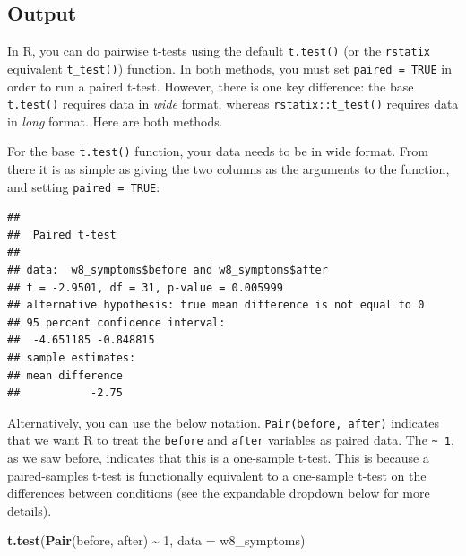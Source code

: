 \documentclass[
]{book}
\newenvironment{Shaded}{\begin{snugshade}}{\end{snugshade}}
\newcommand{\AttributeTok}[1]{\textcolor[rgb]{0.13,0.29,0.53}{#1}}
\newcommand{\ConstantTok}[1]{\textcolor[rgb]{0.56,0.35,0.01}{#1}}
\newcommand{\DecValTok}[1]{\textcolor[rgb]{0.00,0.00,0.81}{#1}}
\newcommand{\FunctionTok}[1]{\textcolor[rgb]{0.13,0.29,0.53}{\textbf{#1}}}
\newcommand{\NormalTok}[1]{#1}
\newcommand{\SpecialCharTok}[1]{\textcolor[rgb]{0.81,0.36,0.00}{\textbf{#1}}}
\begin{document}
\hypertarget{output-4}{%
\subsection{Output}\label{output-4}}

In R, you can do pairwise t-tests using the default \texttt{t.test()} (or the \texttt{rstatix} equivalent \texttt{t\_test()}) function. In both methods, you must set \texttt{paired\ =\ TRUE} in order to run a paired t-test. However, there is one key difference: the base \texttt{t.test()} requires data in \emph{wide} format, whereas \texttt{rstatix::t\_test()} requires data in \emph{long} format. Here are both methods.

For the base \texttt{t.test()} function, your data needs to be in wide format. From there it is as simple as giving the two columns as the arguments to the function, and setting \texttt{paired\ =\ TRUE}:

\begin{Shaded}
\end{Shaded}

\begin{verbatim}
## 
##  Paired t-test
## 
## data:  w8_symptoms$before and w8_symptoms$after
## t = -2.9501, df = 31, p-value = 0.005999
## alternative hypothesis: true mean difference is not equal to 0
## 95 percent confidence interval:
##  -4.651185 -0.848815
## sample estimates:
## mean difference 
##           -2.75
\end{verbatim}

Alternatively, you can use the below notation. \texttt{Pair(before,\ after)} indicates that we want R to treat the \texttt{before} and \texttt{after} variables as paired data. The \texttt{\textasciitilde{}\ 1}, as we saw before, indicates that this is a one-sample t-test. This is because a paired-samples t-test is functionally equivalent to a one-sample t-test on the differences between conditions (see the expandable dropdown below for more details).

\begin{Shaded}
\begin{Highlighting}[]
\FunctionTok{t.test}\NormalTok{(}\FunctionTok{Pair}\NormalTok{(before, after) }\SpecialCharTok{\textasciitilde{}} \DecValTok{1}\NormalTok{, }\AttributeTok{data =}\NormalTok{ w8\_symptoms)}
\end{Highlighting}
\end{Shaded}
\end{document}

